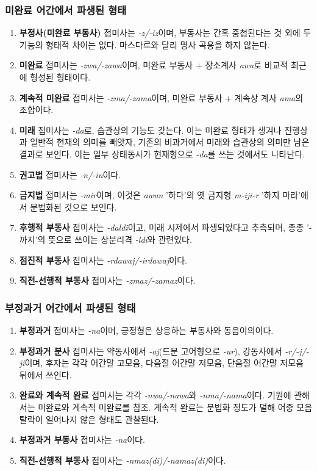 \subsubsection{미완료 어간에서 파생된 형태}
\begin{enumerate}
	\item \textbf{부정사(미완료 부동사)} 접미사는 \textit{-z/-iz}이며, 부동사는 간혹 중첩된다는 것 외에 두 기능의 형태적 차이는 없다. 마스다르와 달리 명사 곡용을 하지 않는다.
	\item \textbf{미완료} 접미사는 \textit{-zwa/-zawa}이며, 미완료 부동사 + 장소계사 \textit{awa}로 비교적 최근에 형성된 형태이다.
	\item \textbf{계속적 미완료} 접미사는 \textit{-zma/-zama}이며, 미완료 부동사 + 계속상 계사 \textit{ama}의 조합이다.
	\item \textbf{미래} 접미사는 \textit{-da}로, 습관상의 기능도 갖는다. 이는 미완료 형태가 생겨나 진행상과 일반적 현재의 의미를 빼앗자, 기존의 비과거에서 미래와 습관상의 의미만 남은 결과로 보인다. 이는 일부 상태동사가 현재형으로 \textit{-da}를 쓰는 것에서도 나타난다.
	\item \textbf{권고법} 접미사는 \textit{-n/-in}이다.
	\item \textbf{금지법} 접미사는 \textit{-mir}이며, 이것은 \textit{awun} '하다'의 옛 금지형 \textit{m-iji-r} '하지 마라'에서 문법화된 것으로 보인다.
	\item \textbf{후행적 부동사} 접미사는 \textit{-daldi}이고, 미래 시제에서 파생되었다고 추측되며, 종종 '-까지'의 뜻으로 쓰이는 상분리격 \textit{-ldi}와 관련있다.
	\item \textbf{점진적 부동사} 접미사는 \textit{-rdawaj/-irdawaj}이다.
	\item \textbf{직전-선행적 부동사} 접미사는 \textit{-zmaz/-zamaz}이다.
\end{enumerate}
\subsubsection{부정과거 어간에서 파생된 형태}
\begin{enumerate}
	\item \textbf{부정과거} 접미사는 \textit{-na}이며, 긍정형은 상응하는 부동사와 동음이의이다.
	\item \textbf{부정과거 분사} 접미사는 약동사에서 \textit{-aj}(드문 고어형으로 \textit{-ur}), 강동사에서 \textit{-r/-j/-ji}이며, 후자는 각각 어간말 고모음, 다음절 어간말 저모음, 단음절 어간말 저모음 뒤에서 쓰인다.
	\item \textbf{완료와 계속적 완료} 접미사는 각각 \textit{-nwa/-nawa}와 \textit{-nma/-nama}이다. 기원에 관해서는 미완료와 계속적 미완료를 참조. 계속적 완료는 문법화 정도가 덜해 어중 모음 탈락이 일어나지 않은 형태도 관찰된다.
	\item \textbf{부정과거 부동사} 접미사는 \textit{-na}이다.
	\item \textbf{직전-선행적 부동사} 접미사는 \textit{-nmaz(di)/-namaz(di)}이다.
\end{enumerate}

